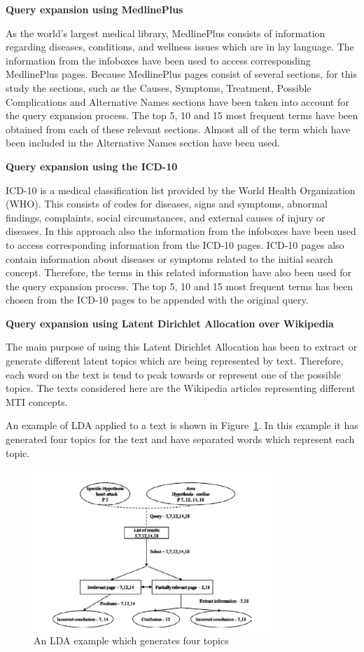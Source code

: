 \documentclass[]{article}
\begin{document}
\textbf{Query expansion using MedlinePlus} 

As the world’s largest medical library, MedlinePlus consists of information regarding diseases, conditions, and wellness issues which are in lay language. The information from the infoboxes have been used to access corresponding MedlinePlus pages. Because MedlinePlus pages consist of several sections, for this study the sections, such as the Causes, Symptoms, Treatment, Possible Complications and Alternative Names sections have been taken into account for the query expansion process. The top 5, 10 and 15 most frequent terms have been obtained from each of these relevant sections. Almost all of the term which have been included in the Alternative Names section have been used.    

\textbf{Query expansion using the ICD-10}

ICD-10 is a medical classification list provided by the World Health Organization (WHO). This consists of codes for diseases, signs and symptoms, abnormal findings, complaints, social circumstances, and external causes of injury or diseases. In this approach also the information from the infoboxes have been used to access corresponding information from the ICD-10 pages. ICD-10 pages also contain information about diseases or symptoms related to the initial search concept. Therefore, the terms in this related information have also been used for the query expansion process. The top 5, 10 and 15 most frequent terms has been chosen from the ICD-10 pages to be appended with the original query.        

\textbf{Query expansion using Latent Dirichlet Allocation over Wikipedia}

The main purpose of using this Latent Dirichlet Allocation has been to extract or generate different latent topics which are being represented by text. Therefore, each word on the text is tend to peak towards or represent one of the possible topics. The texts considered here are the Wikipedia articles representing different MTI concepts.  

An example of LDA applied to a text is shown in Figure~\ref{fig13}. In this example it has generated four topics for the text and have separated words which represent each topic. 

\begin{figure}[t!]
	\includegraphics[width=0.8\textwidth]{Capture13.png}
	\caption{An LDA example which generates four topics \label{fig13}}
\end{figure}
\end{document}
